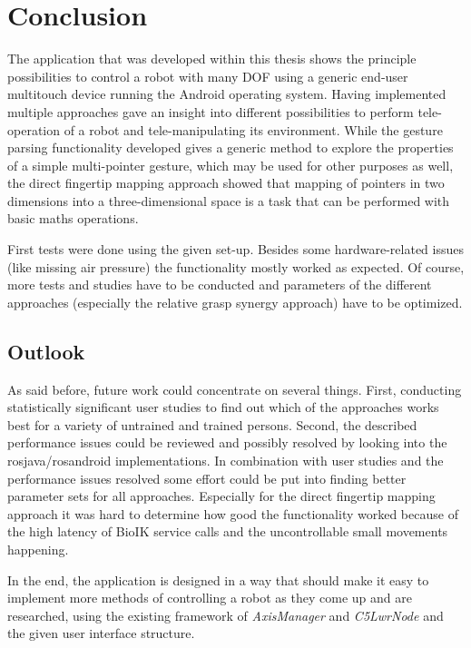 \chapter{Conclusion}
\label{chap:concl}

The application that was developed within this thesis shows the principle possibilities to control a robot with many DOF using a generic end-user multitouch device running the Android operating system. Having implemented multiple approaches gave an insight into different possibilities to perform tele-operation of a robot and  tele-manipulating its environment. While the gesture parsing functionality developed gives a generic method to explore the properties of a simple multi-pointer gesture, which may be used for other purposes as well, the direct fingertip mapping approach showed that mapping of pointers in two dimensions into a three-dimensional space is a task that can be performed with basic maths operations.

First tests were done using the given set-up. Besides some hardware-related issues (like missing air pressure) the functionality mostly worked as expected. Of course, more tests and studies have to be conducted and parameters of the different approaches (especially the relative grasp synergy approach) have to be optimized.

\section{Outlook}

As said before, future work could concentrate on several things. First, conducting statistically significant user studies to find out which of the approaches works best for a variety of untrained and trained persons. Second, the described performance issues could be reviewed and possibly resolved by looking into the rosjava/rosandroid implementations. In combination with user studies and the performance issues resolved some effort could be put into finding better parameter sets for all approaches. Especially for the direct fingertip mapping approach it was hard to determine how good the functionality worked because of the high latency of BioIK service calls and the uncontrollable small movements happening.

In the end, the application is designed in a way that should make it easy to implement more methods of controlling a robot as they come up and are researched, using the existing framework of \textit{AxisManager} and \textit{C5LwrNode} and the given user interface structure.